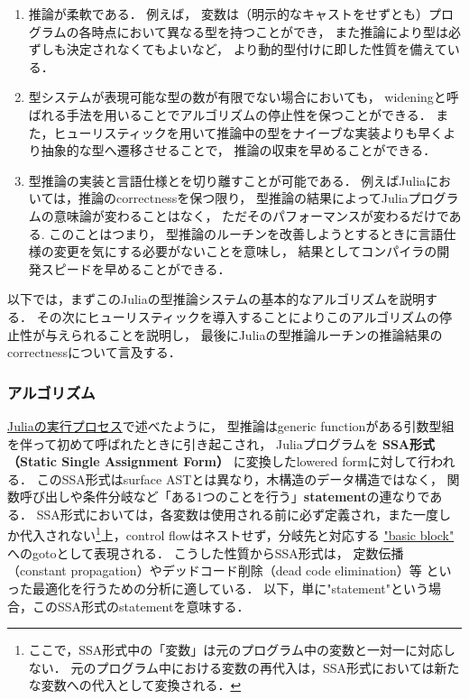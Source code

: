 \begin{enumerate}
  \item 推論が柔軟である．
        例えば，
        変数は（明示的なキャストをせずとも）プログラムの各時点において異なる型を持つことができ，
        また推論により型は必ずしも決定されなくてもよいなど，
        より動的型付けに即した性質を備えている．
  \item 型システムが表現可能な型の数が有限でない場合においても，
        wideningと呼ばれる手法を用いることでアルゴリズムの停止性を保つことができる．
        また，ヒューリスティックを用いて推論中の型をナイーブな実装よりも早くより抽象的な型へ遷移させることで，
        推論の収束を早めることができる．
  \item 型推論の実装と言語仕様とを切り離すことが可能である．
        例えばJuliaにおいては，推論のcorrectnessを保つ限り，
        型推論の結果によってJuliaプログラムの意味論が変わることはなく，
        ただそのパフォーマンスが変わるだけである.
        このことはつまり，
        型推論のルーチンを改善しようとするときに言語仕様の変更を気にする必要がないことを意味し，
        結果としてコンパイラの開発スピードを早めることができる．
\end{enumerate}

以下では，まずこのJuliaの型推論システムの基本的なアルゴリズムを説明する．
その次にヒューリスティックを導入することによりこのアルゴリズムの停止性が与えられることを説明し，
最後にJuliaの型推論ルーチンの推論結果のcorrectnessについて言及する．

\subsubsection{アルゴリズム}

\hyperref[subsubsection:eval-process]{Juliaの実行プロセス}で述べたように，
型推論はgeneric functionがある引数型組を伴って初めて呼ばれたときに引き起こされ，
Juliaプログラムを
\textbf{SSA形式（Static Single Assignment Form）}\cite{julia-ssa}
に変換したlowered formに対して行われる．
このSSA形式はsurface ASTとは異なり，木構造のデータ構造ではなく，
関数呼び出しや条件分岐など「ある1つのことを行う」\textbf{statement}の連なりである．
SSA形式においては，各変数は使用される前に必ず定義され，また一度しか代入されない\footnote{
  ここで，SSA形式中の「変数」は元のプログラム中の変数と一対一に対応しない．
  元のプログラム中における変数の再代入は，SSA形式においては新たな変数への代入として変換される．
}上，control flowはネストせず，分岐先と対応する
\href{https://en.wikipedia.org/wiki/Basic_block}{"basic block"}
へのgotoとして表現される．
こうした性質からSSA形式は，
定数伝播（constant propagation）やデッドコード削除（dead code elimination）等
といった最適化を行うための分析に適している．
以下，単に"statement"という場合，このSSA形式のstatementを意味する．

